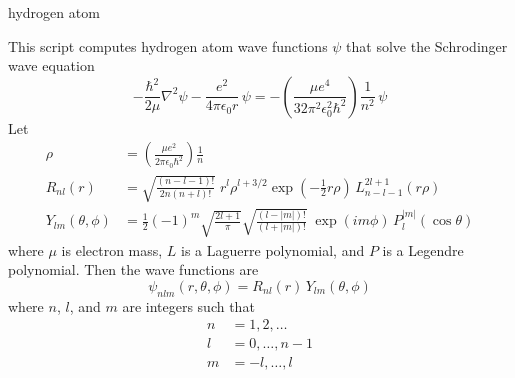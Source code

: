 \documentclass[12pt]{article}
\begin{document}
\begin{center}
{\sc hydrogen atom}
\end{center}

\noindent
This script computes hydrogen atom wave functions $\psi$ that
solve the Schrodinger wave equation
$$
-\frac{\hbar^2}{2\mu}\nabla^2\psi-\frac{e^2}{4\pi\epsilon_0r}\,\psi
=-\left(\frac{\mu e^4}{32\pi^2\epsilon_0^2\hbar^2}\right)\frac{1}{n^2}\,\psi
$$
Let
\begin{align*}
\rho&=\left(\frac{\mu e^2}{2\pi\epsilon_0\hbar^2}\right)\frac{1}{n}\\
%
R_{nl}(r)&=\sqrt{\frac{(n-l-1)!}{2n(n+l)!}}
\;
r^l\rho^{l+3/2}\exp(-{\textstyle\frac{1}{2}}r\rho)\,L_{n-l-1}^{2l+1}(r\rho)\\
%
Y_{lm}(\theta,\phi)&=\frac{1}{2}(-1)^m\sqrt{\frac{2l+1}{\pi}}
\sqrt{\frac{(l-|m|)!}{(l+|m|)!}}
\;
\exp(im\phi)\,P_l^{|m|}(\cos\theta)
\end{align*}
where $\mu$ is electron mass, $L$ is a Laguerre polynomial, and $P$ is a Legendre polynomial.
Then the wave functions are
$$
\psi_{nlm}(r,\theta,\phi)=R_{nl}(r)\,Y_{lm}(\theta,\phi)
$$
where $n$, $l$, and $m$ are integers such that
\begin{align*}
n&=1,2,\ldots\\
l&=0,\ldots,n-1\\
m&=-l,\ldots,l
\end{align*}

\newpage
{}
\end{document}
